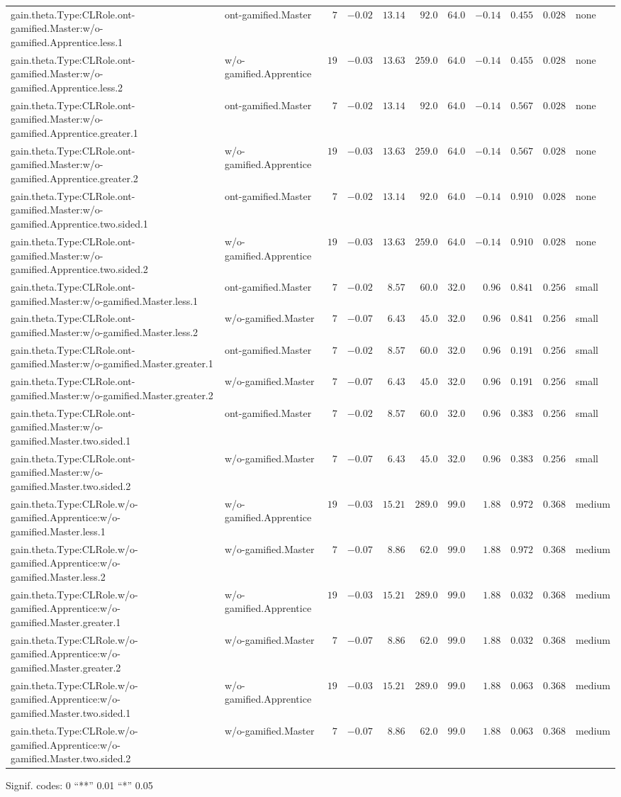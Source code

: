 \documentclass[6pt]{article}
\begin{document}
\begin{landscape}
{\begin{longtable}{llrrrrrrrrl}
gain.theta.Type:CLRole.ont-gamified.Master:w/o-gamified.Apprentice.less.1&ont-gamified.Master&$ 7$&$-0.02$&$13.14$&$ 92.0$&$ 64.0$&$-0.14$&$0.455$&$0.028$&none\tabularnewline
gain.theta.Type:CLRole.ont-gamified.Master:w/o-gamified.Apprentice.less.2&w/o-gamified.Apprentice&$19$&$-0.03$&$13.63$&$259.0$&$ 64.0$&$-0.14$&$0.455$&$0.028$&none\tabularnewline
gain.theta.Type:CLRole.ont-gamified.Master:w/o-gamified.Apprentice.greater.1&ont-gamified.Master&$ 7$&$-0.02$&$13.14$&$ 92.0$&$ 64.0$&$-0.14$&$0.567$&$0.028$&none\tabularnewline
gain.theta.Type:CLRole.ont-gamified.Master:w/o-gamified.Apprentice.greater.2&w/o-gamified.Apprentice&$19$&$-0.03$&$13.63$&$259.0$&$ 64.0$&$-0.14$&$0.567$&$0.028$&none\tabularnewline
gain.theta.Type:CLRole.ont-gamified.Master:w/o-gamified.Apprentice.two.sided.1&ont-gamified.Master&$ 7$&$-0.02$&$13.14$&$ 92.0$&$ 64.0$&$-0.14$&$0.910$&$0.028$&none\tabularnewline
gain.theta.Type:CLRole.ont-gamified.Master:w/o-gamified.Apprentice.two.sided.2&w/o-gamified.Apprentice&$19$&$-0.03$&$13.63$&$259.0$&$ 64.0$&$-0.14$&$0.910$&$0.028$&none\tabularnewline
gain.theta.Type:CLRole.ont-gamified.Master:w/o-gamified.Master.less.1&ont-gamified.Master&$ 7$&$-0.02$&$ 8.57$&$ 60.0$&$ 32.0$&$ 0.96$&$0.841$&$0.256$&small\tabularnewline
gain.theta.Type:CLRole.ont-gamified.Master:w/o-gamified.Master.less.2&w/o-gamified.Master&$ 7$&$-0.07$&$ 6.43$&$ 45.0$&$ 32.0$&$ 0.96$&$0.841$&$0.256$&small\tabularnewline
gain.theta.Type:CLRole.ont-gamified.Master:w/o-gamified.Master.greater.1&ont-gamified.Master&$ 7$&$-0.02$&$ 8.57$&$ 60.0$&$ 32.0$&$ 0.96$&$0.191$&$0.256$&small\tabularnewline
gain.theta.Type:CLRole.ont-gamified.Master:w/o-gamified.Master.greater.2&w/o-gamified.Master&$ 7$&$-0.07$&$ 6.43$&$ 45.0$&$ 32.0$&$ 0.96$&$0.191$&$0.256$&small\tabularnewline
gain.theta.Type:CLRole.ont-gamified.Master:w/o-gamified.Master.two.sided.1&ont-gamified.Master&$ 7$&$-0.02$&$ 8.57$&$ 60.0$&$ 32.0$&$ 0.96$&$0.383$&$0.256$&small\tabularnewline
gain.theta.Type:CLRole.ont-gamified.Master:w/o-gamified.Master.two.sided.2&w/o-gamified.Master&$ 7$&$-0.07$&$ 6.43$&$ 45.0$&$ 32.0$&$ 0.96$&$0.383$&$0.256$&small\tabularnewline
gain.theta.Type:CLRole.w/o-gamified.Apprentice:w/o-gamified.Master.less.1&w/o-gamified.Apprentice&$19$&$-0.03$&$15.21$&$289.0$&$ 99.0$&$ 1.88$&$0.972$&$0.368$&medium\tabularnewline
gain.theta.Type:CLRole.w/o-gamified.Apprentice:w/o-gamified.Master.less.2&w/o-gamified.Master&$ 7$&$-0.07$&$ 8.86$&$ 62.0$&$ 99.0$&$ 1.88$&$0.972$&$0.368$&medium\tabularnewline
gain.theta.Type:CLRole.w/o-gamified.Apprentice:w/o-gamified.Master.greater.1&w/o-gamified.Apprentice&$19$&$-0.03$&$15.21$&$289.0$&$ 99.0$&$ 1.88$&$0.032$&$0.368$&medium\tabularnewline
gain.theta.Type:CLRole.w/o-gamified.Apprentice:w/o-gamified.Master.greater.2&w/o-gamified.Master&$ 7$&$-0.07$&$ 8.86$&$ 62.0$&$ 99.0$&$ 1.88$&$0.032$&$0.368$&medium\tabularnewline
\newpage
gain.theta.Type:CLRole.w/o-gamified.Apprentice:w/o-gamified.Master.two.sided.1&w/o-gamified.Apprentice&$19$&$-0.03$&$15.21$&$289.0$&$ 99.0$&$ 1.88$&$0.063$&$0.368$&medium\tabularnewline
gain.theta.Type:CLRole.w/o-gamified.Apprentice:w/o-gamified.Master.two.sided.2&w/o-gamified.Master&$ 7$&$-0.07$&$ 8.86$&$ 62.0$&$ 99.0$&$ 1.88$&$0.063$&$0.368$&medium\tabularnewline
\hline
\end{longtable}}\end{landscape}
\begin{flushright}{ \tiny{ Signif. codes:  0 ``**'' 0.01 ``*'' 0.05 }}\end{flushright} 
\end{document}
